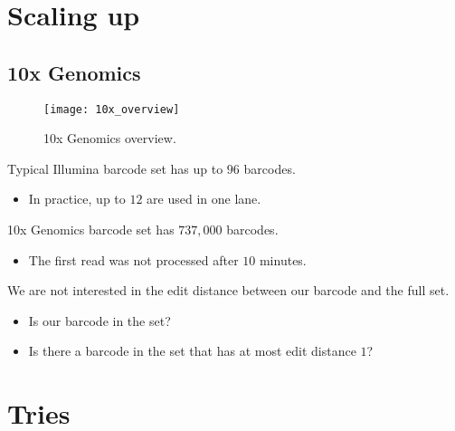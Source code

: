 \documentclass[slidestop]{beamer}
\begin{document}
\section{Scaling up}
\subsection{10x Genomics}
\begin{pframe}
  \begin{figure}[]
    \vspace{-0.5cm}
    \begin{center}
      \texttt{[image: 10x\_overview]}
    \end{center}
    \caption{10x Genomics overview.}
  \end{figure}
\end{pframe}

\begin{pframe}
  Typical Illumina barcode set has up to $96$ barcodes.

  \begin{itemize}
    \item In practice, up to $12$ are used in one lane.
  \end{itemize}
  \bigskip

  10x Genomics barcode set has $737,\!000$ barcodes.

  \begin{itemize}
    \item The first read was not processed after $10$ minutes.
  \end{itemize}
  \bigskip
  \pause

  We are not interested in the edit distance between our barcode and the full
  set.

  \begin{itemize}
    \item Is our barcode in the set?
    \item Is there a barcode in the set that has at most edit distance $1$?
  \end{itemize}
\end{pframe}


\section{Tries}
\end{document}
